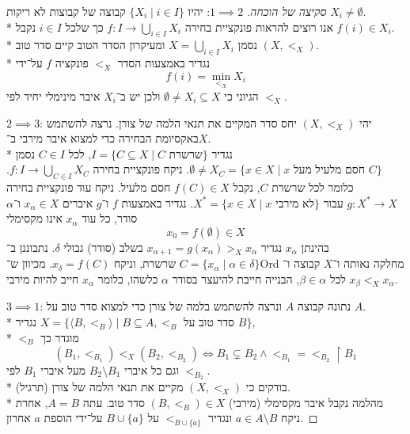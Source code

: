 \begin{proof}[סקיצה של הוכחה]
	$1 \implies 2$:
	יהיו $\{ X_i \mid i \in I \}$ קבוצה של קבוצות לא ריקות $X_i \ne \emptyset$. \\*
	אנו רוצים להראות פונקציית בחירה $f : I \to \bigcup_{i \in I} X_i$ כך שלכל $i \in I$ נקבל $f(i) \in X_i$. \\*
	נסמן $X = \bigcup_{i \in I} X_i$ ומעיקרון הסדר הטוב קיים סדר טוב $(X, <_X)$. \\*
	נגדיר באמצעות הסדר $<_X$ פונקציה $f$ על־ידי
	\[
		f(i) = \min_{<_X} X_i
	\]
	הגיוני כי $\emptyset \ne X_i \subseteq X$ ולכן יש ב־$X_i$ איבר מינימלי יחיד לפי $<_X$.

	$2 \implies 3$:
	יהי $(X, <_X)$ יחס סדר המקיים את תנאי הלמה של צורן.
	נרצה להשתמש באקסיומת הבחירה כדי למצוא איבר מירבי ב־$X$. \\*
	נגדיר $I = \{ C \subseteq X \mid C \text{ שרשרת} \}$, לכל $C \in I$ נסמן $\emptyset \ne X_C = \{ x \in X \mid x \text{ חסם מלעיל מעל $C$} \}$.
	ניקח פונקציית בחירה $f : I \to \bigcup_{C \in I} X_C$.
	כלומר לכל שרשרת $C$, נקבל $f(C) \in X$ חסם מלעיל.
	ניקח עוד פונקציית בחירה $g : X^* \to X$ עבור $X^* = \{ x \in X \mid x \text{ לא מירבי} \}$.
	נגדיר באמצעות $f$ ו־$g$ איברים $x_\alpha \in X$ ו־$\alpha$ סודר, כל עוד $x_\alpha$ אינו מקסימלי
	\[
		x_0 = f(\emptyset) \in X
	\]
	בהינתן $x_\alpha$ נגדיר $x_{\alpha + 1} = g(x_\alpha) >_X x_\alpha$ בשלב (סודר) גבולי $\delta$. נתבוננן ב־$C = \{ x_\alpha \mid \alpha \in \delta \}$ שרשרת, וניקח $x_\delta = f(C)$.
	מכיוון ש־Ord מחלקה נאותה ו־$X$ קבוצה ו־$x_\beta <_X x_\alpha$ לכל $\beta \in \alpha$, הבנייה חייבת להיעצר בסודר $\alpha$ כלשהו, כלומר $x_\alpha$ חייב להיות מירבי.

	$3 \implies 1$:
	נתונה קבוצה $A$ ונרצה להשתמש בלמה של צורן כדי למצוא סדר טוב על $A$. \\*
	נגדיר $X = \{ \langle B, <_B \rangle \mid B \subseteq A, <_B \text{ סדר טוב על $B$} \}$, \\*
	$<_B$ מוגדר כך
	\[
		(B_1, <_{B_1}) <_X (B_2, <_{B_2}) \iff B_1 \subsetneq B_2 \land <_{B_1} = <_{B_2} \upharpoonright B_1
	\]
	וגם כל איברי $B_2 \setminus B_1$ מעל איברי $B_1$ לפי $<_{B_2}$. \\*
	בודקים כי $(X, <_X)$ מקיים את תנאי הלמה של צורן (תרגיל). \\*
	מהלמה נקבל איבר מקסימלי (מירבי) $(B, <_B) \in X$ סדר טוב. עתה $A = B$, אחרת ניקח $a \in A \setminus B$ ונגדיר $<_{B \cup \{ a \}}$ על $B \cup \{ a \}$ על־ידי הוספת $a$ אחרון.
\end{proof}

